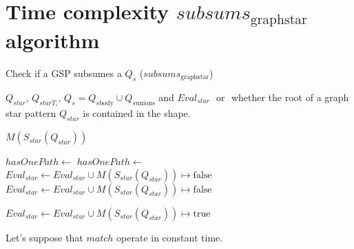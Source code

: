 \section{Time complexity $subsums_{\mathrm{graph star}}$ algorithm}


\begin{algorithm}[h]
    \caption{Check if a GSP subsumes a $Q_s$ ($subsums_{\mathrm{graph star}}$)}\label{alg:containmentTree}
    \begin{algorithmic}
       \scriptsize
 
       \REQUIRE  $Q_{star}$, $Q_{starT_i}$, $Q_s = Q_{s\mathrm{body}} \cup Q_{s\mathrm{unions}}$ and $Eval_{star}$
       \ENSURE \TRUE $ $ or \FALSE $ $ whether the root of a graph star pattern $Q_{star}$ is contained in the shape.
 
          \RETURN $M(S_{star}(Q_{star}))$
       \ENDIF 
 
             \STATE $hasOnePath \gets $ \FALSE
                   \STATE $hasOnePath \gets $ \TRUE
                \ENDIF
             \ENDFOR
             \STATE $Eval_{star} \gets Eval_{star} \cup M(S_{star}(Q_{star})) \mapsto \mathrm{false}$
                \RETURN \FALSE
             \ENDIF
          \ELSE
                  \STATE $Eval_{star} \gets Eval_{star} \cup M(S_{star}(Q_{star})) \mapsto \mathrm{false}$
                   \RETURN \FALSE
                \ENDIF
             \ENDIF
          \ENDIF
       \ENDFOR
 
       \STATE $Eval_{star} \gets Eval_{star} \cup M(S_{star}(Q_{star})) \mapsto \mathrm{true}$
       \RETURN \TRUE
    \end{algorithmic}
 \end{algorithm}

 Let's suppose that $match$ operate in constant time.

